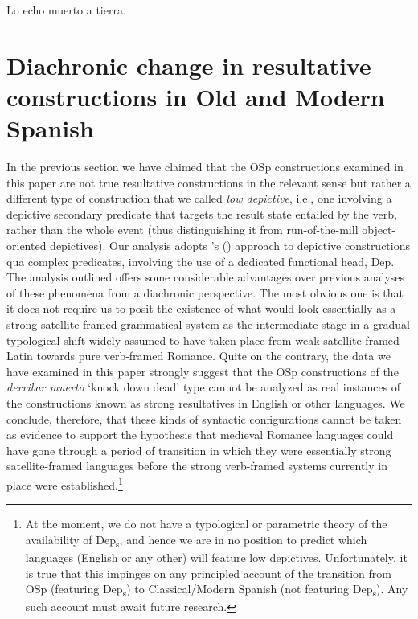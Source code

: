 \documentclass[output=paper,colorlinks,citecolor=brown,
]{langscibook}
\begin{document}
\ea Lo echo muerto a tierra.\\

\z


\section{Diachronic change in resultative constructions in Old and Modern Spanish}\label{sec:acedomatellan:5}


In the previous section we have claimed that the OSp constructions examined in this paper are not true resultative constructions in the relevant sense but rather a different type of construction that we called \emph{low depictive}, i.e., one involving a depictive secondary predicate that targets the result state entailed by the verb, rather than the whole
event (thus distinguishing it from run-of-the-mill object-oriented
depictives). Our analysis adopts  \citeauthor{Pylkkanen2008}’s (\citeyear{Pylkkanen2008}) approach to depictive constructions qua complex predicates, involving the use of a dedicated functional head, Dep.  The analysis outlined  offers  some considerable advantages over previous analyses of these phenomena from a diachronic perspective. The most obvious one is that it does not require us to posit the existence of what would look essentially as a strong-satellite-framed grammatical system as the intermediate stage in a gradual typological shift widely assumed to have taken place from weak-satellite-framed Latin towards pure verb-framed Romance. Quite on the contrary, the data we have examined in this paper strongly suggest that the OSp constructions of the \emph{derribar muerto} `knock down dead' type cannot be analyzed as real instances of the constructions known as strong resultatives in English or other languages. We conclude, therefore, that these kinds of syntactic configurations cannot be taken as evidence to support the hypothesis that medieval Romance languages could have gone through a period of transition in which they were essentially strong satellite-framed languages before the strong verb-framed systems currently in place were established.\footnote{At the moment, we do not have a typological or parametric theory of the availability of Dep\textsubscript{s}, and hence we are in no position to predict which languages (English or any other) will feature low depictives. Unfortunately, it is true that this impinges on any principled account of the transition from OSp (featuring Dep\textsubscript{s}) to Classical/Modern Spanish (not featuring Dep\textsubscript{s}). Any such account must await future research.} 
\end{document}
